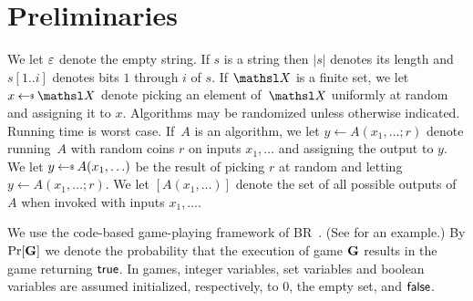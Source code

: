 \section{Preliminaries}\label{sec-defs}

We let $\varepsilon$ denote the empty string. If $s$ is a string then $|s|$ denotes its length and $s[1..i]$ denotes bits $1$ through $i$ of $s$. If $\setX$ is a finite set, we let $x \getsr \setX$ denote picking an element of~$\setX$ uniformly at random and assigning it to $x$.
Algorithms may be randomized unless otherwise indicated. Running time is worst case.
If~$A$ is an algorithm, we let $y \gets A(x_1,\ldots;r)$ denote running~$A$ with random coins $r$ on inputs $x_1,\ldots$ and assigning the output to $y$.
We let $y \getsr A(x_1,\ldots)$ be the result of picking $r$ at random and letting $y \gets A(x_1,\ldots;r)$. We let $[A(x_1,\ldots)]$ denote the set of all possible outputs of $A$ when invoked with inputs $x_1,\ldots$.

We use the code-based game-playing framework of BR~\cite{EC:BelRog06}. (See  for an example.) By $\Pr[\mathbf{G}]$ we denote the probability that the execution of game $\mathbf{G}$ results in the game returning $\mathsf{true}$. In games, integer variables, set variables and boolean variables are assumed initialized, respectively, to $0$, the empty set, and $\mathsf{false}$.